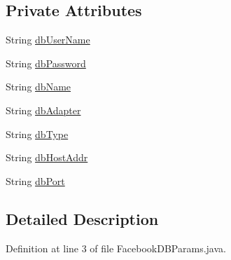 \subsection*{Private Attributes}
\begin{DoxyCompactItemize}
\item 
String \hyperlink{classorg_1_1facebook_1_1crawler_1_1_facebook_d_b_params_a071310325d52d718a551589c58abd033}{db\-User\-Name}
\item 
String \hyperlink{classorg_1_1facebook_1_1crawler_1_1_facebook_d_b_params_a657c173c9d823eaba4721f6eaa2ede3f}{db\-Password}
\item 
String \hyperlink{classorg_1_1facebook_1_1crawler_1_1_facebook_d_b_params_a7f77783a820785d9c6b19bd5c3072d94}{db\-Name}
\item 
String \hyperlink{classorg_1_1facebook_1_1crawler_1_1_facebook_d_b_params_a1144f8f5b1df2af72ad8e1f8980024b7}{db\-Adapter}
\item 
String \hyperlink{classorg_1_1facebook_1_1crawler_1_1_facebook_d_b_params_a080ce06d866679ccd36d9a3d445323e2}{db\-Type}
\item 
String \hyperlink{classorg_1_1facebook_1_1crawler_1_1_facebook_d_b_params_a793ad021972ce5b5b6bb88be88f01c67}{db\-Host\-Addr}
\item 
String \hyperlink{classorg_1_1facebook_1_1crawler_1_1_facebook_d_b_params_ad96c828b8283b58569f4560dacb0145d}{db\-Port}
\end{DoxyCompactItemize}


\subsection{Detailed Description}


Definition at line 3 of file Facebook\-D\-B\-Params.\-java.



